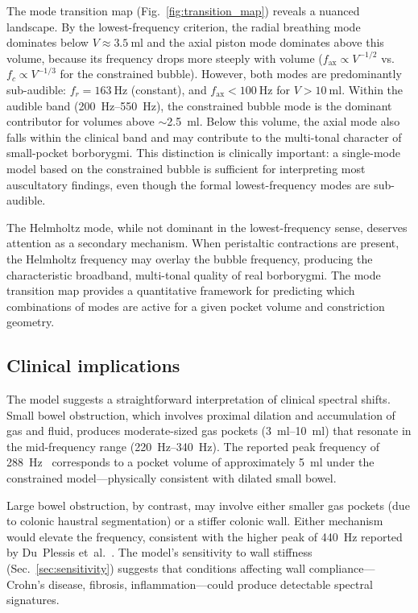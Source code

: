 \documentclass[review]{elsarticle}
\begin{document}
The mode transition map (Fig.~\ref{fig:transition_map}) reveals a nuanced
landscape.  By the lowest-frequency criterion, the radial breathing mode
dominates below $V \approx \SI{3.5}{\milli\litre}$ and the axial piston mode
dominates above this volume, because its frequency drops more steeply with
volume ($f_\mathrm{ax} \propto V^{-1/2}$ vs.\ $f_c \propto V^{-1/3}$ for
the constrained bubble).  However, both modes are predominantly sub-audible:
$f_r = \SI{163}{\hertz}$ (constant), and $f_\mathrm{ax} < \SI{100}{\hertz}$
for $V > \SI{10}{\milli\litre}$.  Within the audible band
(\SIrange{200}{550}{\hertz}), the constrained bubble mode is the dominant
contributor for volumes above $\sim$\SI{2.5}{\milli\litre}.  Below this
volume, the axial mode also falls within the clinical band and may contribute
to the multi-tonal character of small-pocket borborygmi.  This distinction
is clinically important: a single-mode model based on the constrained
bubble is sufficient for interpreting most auscultatory findings, even though
the formal lowest-frequency modes are sub-audible.

The Helmholtz mode, while not dominant in the lowest-frequency sense,
deserves attention as a secondary mechanism.  When peristaltic contractions
are present, the Helmholtz frequency may overlay the bubble frequency,
producing the characteristic broadband, multi-tonal quality of real
borborygmi.  The mode transition map provides a quantitative framework for
predicting which combinations of modes are active for a given pocket volume
and constriction geometry.

\subsection{Clinical implications}
\label{sec:clinical_implications}

The model suggests a straightforward interpretation of clinical spectral
shifts.  Small bowel obstruction, which involves proximal dilation and
accumulation of gas and fluid, produces moderate-sized gas pockets
(\SIrange{3}{10}{\milli\litre}) that resonate in the mid-frequency range
(\SIrange{220}{340}{\hertz}).  The reported peak frequency of
\SI{288}{\hertz}~\cite{Yoshino1990} corresponds to a pocket volume of
approximately \SI{5}{\milli\litre} under the constrained model---physically
consistent with dilated small bowel.

Large bowel obstruction, by contrast, may involve either smaller gas
pockets (due to colonic haustral segmentation) or a stiffer colonic wall.
Either mechanism would elevate the frequency, consistent with the higher
peak of \SI{440}{\hertz} reported by Du~Plessis et~al.~\cite{DuPlessis2000}.
The model's sensitivity to wall stiffness (Sec.~\ref{sec:sensitivity})
suggests that conditions affecting wall compliance---Crohn's disease, fibrosis,
inflammation---could produce detectable spectral signatures.
\end{document}
